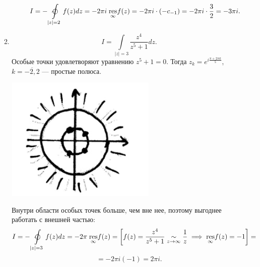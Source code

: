 \documentclass[../../main.tex]{subfiles}
\begin{document}
\begin{examples}
\begin{enumerate}
\begin{enumerate}
\begin{center}
	 			\end{center}
	 			\[
	 			I=-\ointclockwise\limits_{|z|=2}f(z)dz= -2\pi i\; \underset{\infty}{\res} f(z) = 
	 			-2\pi i \cdot(-c_{-1}) = -2 \pi i \cdot \dfrac{3}{2} = -3\pi i.\]
			\end{enumerate}
			\item \[I=\int\limits_{|z|=3} \dfrac{z^4}{z^5+1}dz.\]
			Особые точки удовлетворяют уравнению $z^5+1=0$.
			Тогда $z_k=e^{i\tfrac{\pi+2\pi k}{5}}$, $k=\overline{-2,2}$ ---
			простые полюса.
 			\begin{center}
			\includegraphics{lec35_5}
			\end{center}
			Внутри области особых точек больше, чем вне нее, поэтому выгоднее 
			работать с внешней частью:
 			\[I=-\ointclockwise
 			\limits_{|z|=3}f(z)dz=-2\pi\;\underset{\infty}{\res}f(z)=\left[ 
 			f(z)=\dfrac{z^4}{z^5+1} \underset{z \rightarrow \infty}\sim \dfrac 1z \implies 
 			\underset{\infty}{\res} f(z)=-1 \right]=\]\[=-2\pi i(-1) = 2\pi i.
 			\]	
	 	\end{enumerate}
	 \end{examples}	
\end{document}
